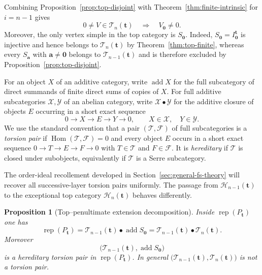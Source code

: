 \documentclass[10pt,a4paper]{amsart}
\newtheorem{proposition}[theorem]{Proposition}
\newcommand{\Rep}{\operatorname{rep}}
\newcommand{\Hom}{\operatorname{Hom}}
\begin{document}
Combining Proposition~\ref{prop:top-disjoint} with Theorem~\ref{thm:finite-intrinsic} for $i=n-1$ gives
\[
0\ne V\in\mathcal T_n(\mathbf t)
\quad\Longrightarrow\quad
V_{\mathbf0}\ne0.
\]
Moreover, the only vertex simple in the top category is $S_{\mathbf0}$.  Indeed, $S_{\mathbf0}=I^{\mathbf t}_{\mathbf0}$ is injective and hence belongs to $\mathcal T_n(\mathbf t)$ by Theorem~\ref{thm:top-finite}, whereas every $S_{\mathbf a}$ with $\mathbf a\ne\mathbf0$ belongs to $\mathcal T_{n-1}(\mathbf t)$ and is therefore excluded by Proposition~\ref{prop:top-disjoint}.

For an object $X$ of an additive category, write $\operatorname{add}X$ for
the full subcategory of direct summands of finite direct sums of copies of
$X$.  For full additive subcategories $\mathcal X,\mathcal Y$ of an abelian
category, write $\mathcal X\bullet\mathcal Y$ for the additive closure of
objects $E$ occurring in a short exact sequence
\[
0\longrightarrow X\longrightarrow E\longrightarrow Y\longrightarrow0,
\qquad X\in\mathcal X,\quad Y\in\mathcal Y.
\]
We use the standard convention that a pair $(\mathcal T,\mathcal F)$ of full
subcategories is a \emph{torsion pair} if
$\Hom(\mathcal T,\mathcal F)=0$ and every object $E$ occurs in a short exact
sequence $0\to T\to E\to F\to0$ with $T\in\mathcal T$ and
$F\in\mathcal F$.  It is \emph{hereditary} if $\mathcal T$ is closed under
subobjects, equivalently if $\mathcal T$ is a Serre subcategory.

The order-ideal recollement developed in
Section~\ref{sec:general-fs-theory} will recover all successive-layer torsion
pairs uniformly.  The passage from $\mathcal H_{n-1}(\mathbf t)$ to the exceptional top category
$\mathcal H_n(\mathbf t)$ behaves differently.

\begin{proposition}[Top--penultimate extension decomposition]\label{prop:top-penultimate}
Inside $\Rep(P_{\mathbf t})$ one has
\[
\Rep(P_{\mathbf t})
=
\mathcal T_{n-1}(\mathbf t)\bullet\operatorname{add}S_{\mathbf0}
=
\mathcal T_{n-1}(\mathbf t)\bullet\mathcal T_n(\mathbf t).
\]
Moreover
\[
\bigl(\mathcal T_{n-1}(\mathbf t),\operatorname{add}S_{\mathbf0}\bigr)
\]
is a hereditary torsion pair in $\Rep(P_{\mathbf t})$.  In general
$\bigl(\mathcal T_{n-1}(\mathbf t),\mathcal T_n(\mathbf t)\bigr)$ is
not a torsion pair.
\end{proposition}
\end{document}

